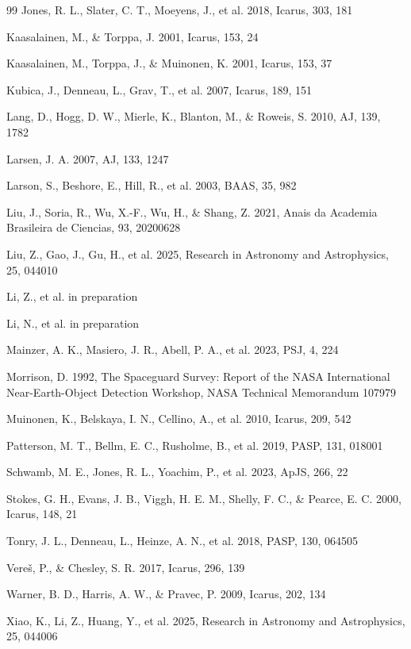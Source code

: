 \documentclass[referee]{raa}
\begin{document}
\begin{thebibliography}{99}
Jones, R. L., Slater, C. T., Moeyens, J., et al. 2018, Icarus, 303, 181

Kaasalainen, M., \& Torppa, J. 2001, Icarus, 153, 24

Kaasalainen, M., Torppa, J., \& Muinonen, K. 2001, Icarus, 153, 37

Kubica, J., Denneau, L., Grav, T., et al. 2007, Icarus, 189, 151

Lang, D., Hogg, D. W., Mierle, K., Blanton, M., \& Roweis, S. 2010, AJ, 139, 1782

Larsen, J. A. 2007, AJ, 133, 1247

Larson, S., Beshore, E., Hill, R., et al. 2003, BAAS, 35, 982

Liu, J., Soria, R., Wu, X.-F., Wu, H., \& Shang, Z. 2021, Anais da Academia Brasileira de Ciencias, 93, 20200628

Liu, Z., Gao, J., Gu, H., et al. 2025, Research in Astronomy and Astrophysics, 25, 044010

Li, Z., et al. in preparation

Li, N., et al. in preparation

Mainzer, A. K., Masiero, J. R., Abell, P. A., et al. 2023, PSJ, 4, 224

Morrison, D. 1992, The Spaceguard Survey: Report of the NASA International Near-Earth-Object Detection Workshop, NASA Technical Memorandum 107979

Muinonen, K., Belskaya, I. N., Cellino, A., et al. 2010, Icarus, 209, 542

Patterson, M. T., Bellm, E. C., Rusholme, B., et al. 2019, PASP, 131, 018001

Schwamb, M. E., Jones, R. L., Yoachim, P., et al. 2023, ApJS, 266, 22

Stokes, G. H., Evans, J. B., Viggh, H. E. M., Shelly, F. C., \& Pearce, E. C. 2000, Icarus, 148, 21

Tonry, J. L., Denneau, L., Heinze, A. N., et al. 2018, PASP, 130, 064505

Vere\v{s}, P., \& Chesley, S. R. 2017, Icarus, 296, 139

Warner, B. D., Harris, A. W., \& Pravec, P. 2009, Icarus, 202, 134

Xiao, K., Li, Z., Huang, Y., et al. 2025, Research in Astronomy and Astrophysics, 25, 044006

\end{thebibliography}
\end{document}
